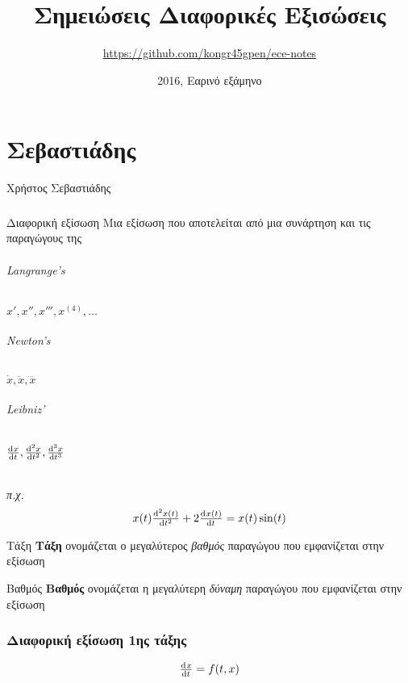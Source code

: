 \documentclass[11pt,a4paper,titlepage,final]{article}
\title{Σημειώσεις Διαφορικές Εξισώσεις}
\date{2016, Εαρινό εξάμηνο}
\author{\textlatin{\url{https://github.com/kongr45gpen/ece-notes}}}
\begin{document}
\maketitle

\tableofcontents

\newpage

\part{Σεβαστιάδης}
Χρήστος Σεβαστιάδης

\section{}

\begin{defn*}{Διαφορική εξίσωση}
Μια εξίσωση που αποτελείται από μια συνάρτηση και τις παραγώγους της
\end{defn*}

\paragraph{\textlatin{Langrange's}}
\(x',x'',x''',x^{(4)},\dots\)
\paragraph{\textlatin{Newton's}}
\(\dot{x}, \ddot{x}, \dddot{x}\)
\paragraph{\textlatin{Leibniz'}}
\(\od{x}{t}, \od[2]{x}{t}, \od[3]{x}{t}\)

\paragraph{}
\textit{π.χ.}
\[
x(t) \od[2]{x(t)}{t} + 2 \od{x(t)}{t}=x(t)\sin (t)
\]

\begin{defn}{Τάξη}{}
\textbf{Τάξη} ονομάζεται ο μεγαλύτερος \emph{βαθμός} παραγώγου που εμφανίζεται στην εξίσωση
\end{defn}

\begin{defn}{Βαθμός}{}
\textbf{Βαθμός} ονομάζεται η μεγαλύτερη \emph{δύναμη} παραγώγου που εμφανίζεται στην εξίσωση
\end{defn}


\section{Διαφορική εξίσωση 1ης τάξης}
\begin{defn*}{}
\[
\od{x}{t}=f(t,x)
\]
\end{defn*}
\end{document}
